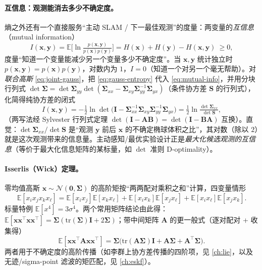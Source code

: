 \paragraph{互信息：观测能消去多少不确定度。}
熵之外还有一个直接服务“主动 SLAM / 下一最佳观测”的度量：两变量的\emph{互信息}（mutual information）
\begin{equation}
  I(\mathbf{x},\mathbf{y})=\mathbb{E}\!\Big[\ln\tfrac{p(\mathbf{x},\mathbf{y})}{p(\mathbf{x})p(\mathbf{y})}\Big]
  =H(\mathbf{x})+H(\mathbf{y})-H(\mathbf{x},\mathbf{y})\ \ge 0,
  \label{eq:mutual-info}
\end{equation}
度量“知道一个变量能减少另一个变量多少不确定度”\cite{barfoot2024state}。当 $\mathbf{x},\mathbf{y}$ 统计独立时 $p(\mathbf{x},\mathbf{y})=p(\mathbf{x})p(\mathbf{y})$，对数内为 $1$，$I=0$（知道一个对另一个毫无帮助）。对\emph{联合高斯} \cref{eq:joint-gauss}，把 \cref{eq:gauss-entropy} 代入 \cref{eq:mutual-info}，并用分块行列式 $\det\boldsymbol{\Sigma}=\det\boldsymbol{\Sigma}_{yy}\det(\boldsymbol{\Sigma}_{xx}-\boldsymbol{\Sigma}_{xy}\boldsymbol{\Sigma}_{yy}^{-1}\boldsymbol{\Sigma}_{yx})$（条件协方差 $\mathbf{S}$ 的行列式），化简得纯协方差的闭式
\begin{equation}
  I(\mathbf{x},\mathbf{y})=-\tfrac12\ln\det\big(\mathbf{I}-\boldsymbol{\Sigma}_{xx}^{-1}\boldsymbol{\Sigma}_{xy}\boldsymbol{\Sigma}_{yy}^{-1}\boldsymbol{\Sigma}_{yx}\big)
  =\tfrac12\ln\tfrac{\det\boldsymbol{\Sigma}_{xx}}{\det\mathbf{S}},
  \label{eq:gauss-mutual-info}
\end{equation}
（两写法经 Sylvester 行列式定理 $\det(\mathbf{I}-\mathbf{A}\mathbf{B})=\det(\mathbf{I}-\mathbf{B}\mathbf{A})$ 互换）。直觉：$\det\boldsymbol{\Sigma}_{xx}/\det\mathbf{S}$ 是“观测 $\mathbf{y}$ 前后 $\mathbf{x}$ 的不确定椭球体积之比”，其对数（除以 $2$）就是这次观测带来的信息量。主动感知/最优实验设计正是\emph{最大化候选观测的互信息}（等价于最大化信息矩阵的某标量，如 $\det$ 准则 D-optimality）。

\paragraph{Isserlis（Wick）定理。}
零均值高斯 $\mathbf{x}\sim\mathcal{N}(\mathbf{0},\boldsymbol{\Sigma})$ 的高阶矩按“两两配对乘积之和”计算，四变量情形
\begin{equation}
  \mathbb{E}[x_i x_j x_k x_\ell]=\mathbb{E}[x_i x_j]\mathbb{E}[x_k x_\ell]+\mathbb{E}[x_i x_k]\mathbb{E}[x_j x_\ell]+\mathbb{E}[x_i x_\ell]\mathbb{E}[x_j x_k].
  \label{eq:isserlis}
\end{equation}
标量特例 $\mathbb{E}[x^4]=3\sigma^4$。两个常用矩阵结论由此得：$\mathbb{E}[\mathbf{x}\mathbf{x}^\top\mathbf{x}\mathbf{x}^\top]=\boldsymbol{\Sigma}(\mathrm{tr}(\boldsymbol{\Sigma})\mathbf{I}+2\boldsymbol{\Sigma})$；带中间矩阵 $\mathbf{A}$ 的更一般式（逐对配对 + 收集得）
\begin{equation}
  \mathbb{E}[\mathbf{x}\mathbf{x}^\top\mathbf{A}\mathbf{x}\mathbf{x}^\top]=\boldsymbol{\Sigma}\big(\mathrm{tr}(\mathbf{A}\boldsymbol{\Sigma})\mathbf{I}+\mathbf{A}\boldsymbol{\Sigma}+\mathbf{A}^\top\boldsymbol{\Sigma}\big).
  \label{eq:isserlis-A}
\end{equation}
两者用于不确定度的高阶传播（如李群上协方差传播的四阶项，见 \cref{ch:lie}，以及无迹/sigma-point 滤波的矩匹配，见 \cref{ch:eskf}）。

